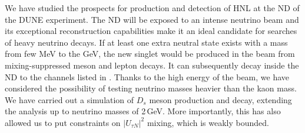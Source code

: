 We have studied the prospects for production and detection of HNL at the ND of the DUNE experiment.
The ND will be exposed to an intense neutrino beam and its exceptional reconstruction capabilities make it %
an ideal candidate for searches of heavy neutrino decays.
If at least one extra neutral state exists with a mass from few MeV to the GeV, %
the new singlet would be produced in the beam from mixing-suppressed meson and lepton decays.
It can subsequently decay inside the ND to the channels listed in .
Thanks to the high energy of the beam, we have considered the possibility of testing neutrino masses heavier than the kaon mass.
We have carried out a simulation of $D_s$ meson production and decay, extending the analysis up to neutrino masses of 2\,GeV. %
More importantly, this has also allowed us to put constraints on $|U_{\tau N}|^2$ mixing, which is weakly bounded.

